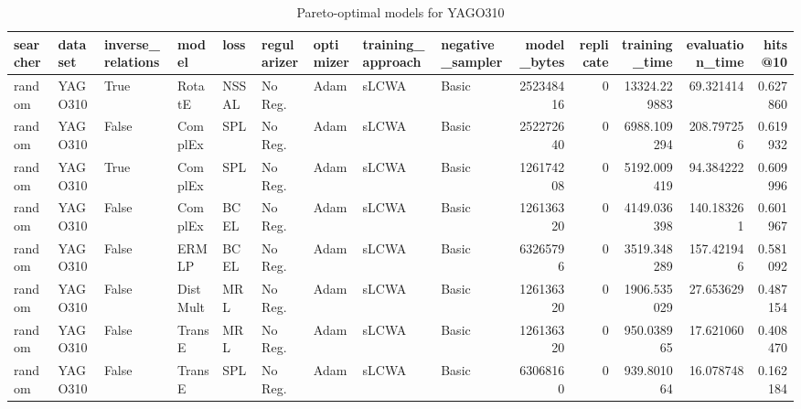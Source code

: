 \begin{table}
\centering
\caption{Pareto-optimal models for YAGO310}
\begin{tabular}{lllllllllrrrrr}
\toprule
searcher &  dataset & inverse\_relations &     model &   loss & regularizer & optimizer & training\_approach & negative\_sampler &  model\_bytes &  replicate &  training\_time &  evaluation\_time &   hits@10 \\
\midrule
  random &  YAGO310 &              True &    RotatE &  NSSAL &     No Reg. &      Adam &             sLCWA &            Basic &    252348416 &          0 &   13324.229883 &        69.321414 &  0.627860 \\
  random &  YAGO310 &             False &   ComplEx &    SPL &     No Reg. &      Adam &             sLCWA &            Basic &    252272640 &          0 &    6988.109294 &       208.797256 &  0.619932 \\
  random &  YAGO310 &              True &   ComplEx &    SPL &     No Reg. &      Adam &             sLCWA &            Basic &    126174208 &          0 &    5192.009419 &        94.384222 &  0.609996 \\
  random &  YAGO310 &             False &   ComplEx &   BCEL &     No Reg. &      Adam &             sLCWA &            Basic &    126136320 &          0 &    4149.036398 &       140.183261 &  0.601967 \\
  random &  YAGO310 &             False &     ERMLP &   BCEL &     No Reg. &      Adam &             sLCWA &            Basic &     63265796 &          0 &    3519.348289 &       157.421946 &  0.581092 \\
  random &  YAGO310 &             False &  DistMult &    MRL &     No Reg. &      Adam &             sLCWA &            Basic &    126136320 &          0 &    1906.535029 &        27.653629 &  0.487154 \\
  random &  YAGO310 &             False &    TransE &    MRL &     No Reg. &      Adam &             sLCWA &            Basic &    126136320 &          0 &     950.038965 &        17.621060 &  0.408470 \\
  random &  YAGO310 &             False &    TransE &    SPL &     No Reg. &      Adam &             sLCWA &            Basic &     63068160 &          0 &     939.801064 &        16.078748 &  0.162184 \\
\bottomrule
\end{tabular}
\end{table}

